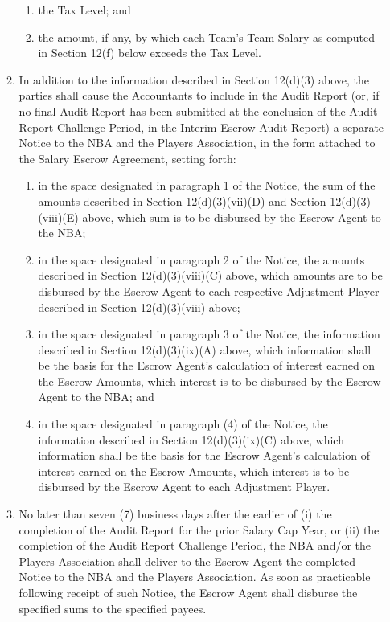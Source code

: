 \documentclass[
]{book}
\providecommand{\tightlist}{%
  \setlength{\itemsep}{0pt}\setlength{\parskip}{0pt}}
\begin{document}
\begin{enumerate}
\begin{enumerate}
\begin{enumerate}
    \item
      the Tax Level; and
    \item
      the amount, if any, by which each Team's Team Salary as computed in Section 12(f) below exceeds the Tax Level.
    \end{enumerate}
  \item
    In addition to the information described in Section 12(d)(3) above, the parties shall cause the Accountants to include in the Audit Report (or, if no final Audit Report has been submitted at the conclusion of the Audit Report Challenge Period, in the Interim Escrow Audit Report) a separate Notice to the NBA and the Players Association, in the form attached to the Salary Escrow Agreement, setting forth:

    \begin{enumerate}
    \def\labelenumiii{(\roman{enumiii})}
    \tightlist
    \item
      in the space designated in paragraph 1 of the Notice, the sum of the amounts described in Section 12(d)(3)(vii)(D) and Section 12(d)(3)(viii)(E) above, which sum is to be disbursed by the Escrow Agent to the NBA;
    \item
      in the space designated in paragraph 2 of the Notice, the amounts described in Section 12(d)(3)(viii)(C) above, which amounts are to be disbursed by the Escrow Agent to each respective Adjustment Player described in Section 12(d)(3)(viii) above;
    \item
      in the space designated in paragraph 3 of the Notice, the information described in Section 12(d)(3)(ix)(A) above, which information shall be the basis for the Escrow Agent's calculation of interest earned on the Escrow Amounts, which interest is to be disbursed by the Escrow Agent to the NBA; and
    \item
      in the space designated in paragraph (4) of the Notice, the information described in Section 12(d)(3)(ix)(C) above, which information shall be the basis for the Escrow Agent's calculation of interest earned on the Escrow Amounts, which interest is to be disbursed by the Escrow Agent to each Adjustment Player.
    \end{enumerate}
  \item
    No later than seven (7) business days after the earlier of (i) the completion of the Audit Report for the prior Salary Cap Year, or (ii) the completion of the Audit Report Challenge Period, the NBA and/or the Players Association shall deliver to the Escrow Agent the completed Notice to the NBA and the Players Association. As soon as practicable following receipt of such Notice, the Escrow Agent shall disburse the specified sums to the specified payees.

\end{enumerate}
\end{enumerate}
\end{document}
